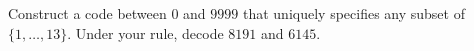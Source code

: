 Construct a code between $0$ and $9999$ that uniquely specifies any subset of $\{1,\ldots,13\}$. Under your rule, decode $8191$ and $6145$.
